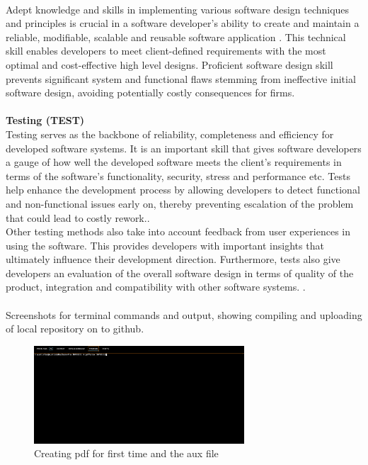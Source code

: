 \documentclass[a4paper, 11pt]{report}
\begin{document}
\\[1em]
 Adept knowledge and skills in implementing various software design techniques and principles is crucial in a software developer’s ability to create and maintain a reliable, modifiable, scalable and reusable software application \cite{SWDN1}\cite{SWDN2}. This technical skill enables developers to meet client-defined requirements with the most optimal and cost-effective high level designs. Proficient software design skill prevents significant system and functional flaws stemming from ineffective initial software design, avoiding potentially costly consequences for firms.\cite{SWDN1}
\\[1em]
\\[1em]
\noindent \textbf {Testing (TEST)}
\\[1em]
Testing serves as the backbone of reliability, completeness and efficiency for developed software systems. It is an important skill that gives software developers a gauge of how well the developed software meets the client’s requirements in terms of the software’s functionality, security, stress and performance etc.\cite{TEST1}  Tests help enhance the development process by allowing developers to detect functional and non-functional issues early on, thereby preventing escalation of the problem that could lead to costly rework.\cite{TEST2}\cite{TEST3}.
\\[1em]
Other testing methods also take into account feedback from user experiences in using the software. This provides developers with important insights that ultimately influence their development direction. Furthermore, tests also give developers an evaluation of the overall software design in terms of quality of the product, integration and compatibility with other software systems.
\cite{TEST2}.
\\[1em]
\\[1em]
Screenshots for terminal commands and output, showing compiling and uploading of local repository on to github. 
\begin{figure}[H]
    \centering
    \includegraphics[width=0.7\textwidth]{com1}
    \caption{Creating pdf for first time and the aux file}
\end{figure}
\end{document}
